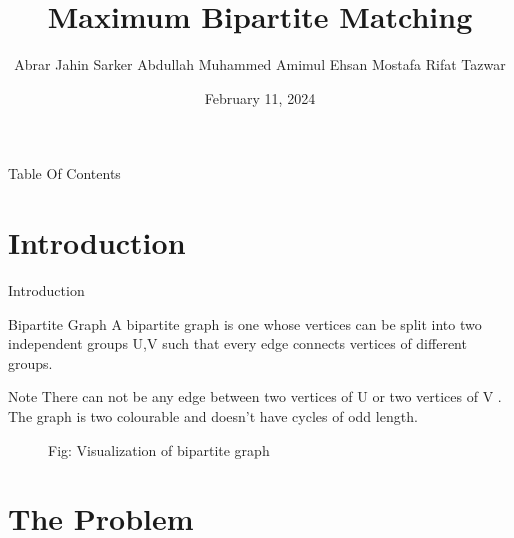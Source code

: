 \documentclass{beamer}
\title{Maximum Bipartite Matching}
\author[Jahin $(2005012)$, Amim $(2005017)$ \& Tazwar $(2005020)$]
{Abrar Jahin Sarker\inst{1} \newline Abdullah  Muhammed  Amimul Ehsan\inst{2} \newline Mostafa Rifat Tazwar\inst{3}}
\institute[VFU] %
{
  \inst{1}$2005012$
  \and
  \inst{2}$2005017$
  \and
  \inst{3}$2005020$
  \and
  \inst{1,2,3}Department of Computer Science and Technology, BUET
}
\date{February 11, 2024}
\begin{document}
\begin{frame}
    \titlepage
\end{frame}

\begin{frame}{Table Of Contents}
    \tableofcontents
\end{frame}


\section{Introduction}
\begin{frame}{Introduction}
    

\begin{block}{Bipartite Graph}
    A bipartite graph is one whose vertices can be split into two independent groups U,V such that every edge connects vertices of different groups.
\end{block}
\begin{alertblock}{Note}
 There can not be any edge between two vertices of U or two vertices of V .\\
     The graph is two colourable and doesn't have cycles of odd length.

\end{alertblock}

    \begin{figure}
        \centering
        \caption{Fig: Visualization of bipartite graph}
    \end{figure}

\end{frame}
    


\section{The Problem}
\end{document}
